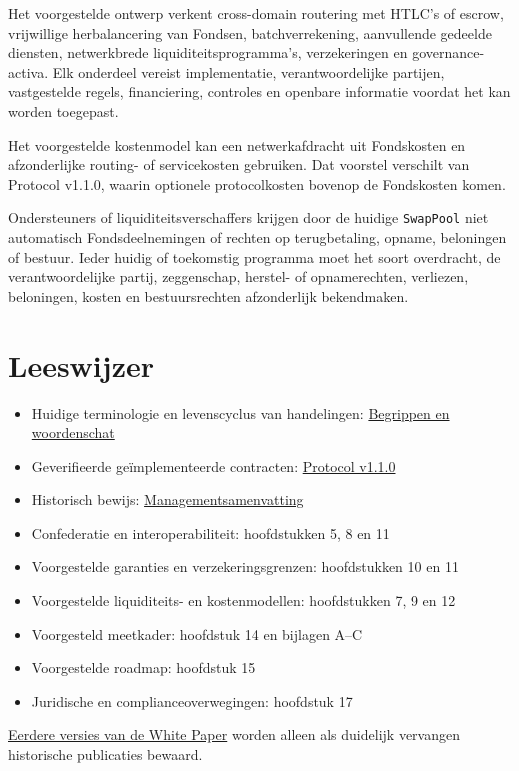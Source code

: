 \documentclass[11pt]{article}
\begin{document}
Het voorgestelde ontwerp verkent cross-domain routering met HTLC's of escrow, vrijwillige herbalancering van Fondsen, batchverrekening, aanvullende gedeelde diensten, netwerkbrede liquiditeitsprogramma's, verzekeringen en governance-activa. Elk onderdeel vereist implementatie, verantwoordelijke partijen, vastgestelde regels, financiering, controles en openbare informatie voordat het kan worden toegepast.

Het voorgestelde kostenmodel kan een netwerkafdracht uit Fondskosten en afzonderlijke routing- of servicekosten gebruiken. Dat voorstel verschilt van Protocol v1.1.0, waarin optionele protocolkosten bovenop de Fondskosten komen.

Ondersteuners of liquiditeitsverschaffers krijgen door de huidige \texttt{SwapPool} niet automatisch Fondsdeelnemingen of rechten op terugbetaling, opname, beloningen of bestuur. Ieder huidig of toekomstig programma moet het soort overdracht, de verantwoordelijke partij, zeggenschap, herstel- of opnamerechten, verliezen, beloningen, kosten en bestuursrechten afzonderlijk bekendmaken.

\section*{Leeswijzer}

\begin{itemize}[leftmargin=*]
\item Huidige terminologie en levenscyclus van handelingen: \href{https://docs.cosmolocal.credit/nl-BE/introduction/concepts}{Begrippen en woordenschat}
\item Geverifieerde geïmplementeerde contracten: \href{https://docs.cosmolocal.credit/nl-BE/protocol/overview}{Protocol v1.1.0}
\item Historisch bewijs: \href{https://docs.cosmolocal.credit/nl-BE/white-paper/executive-summary}{Managementsamenvatting}
\item Confederatie en interoperabiliteit: hoofdstukken 5, 8 en 11
\item Voorgestelde garanties en verzekeringsgrenzen: hoofdstukken 10 en 11
\item Voorgestelde liquiditeits- en kostenmodellen: hoofdstukken 7, 9 en 12
\item Voorgesteld meetkader: hoofdstuk 14 en bijlagen A--C
\item Voorgestelde roadmap: hoofdstuk 15
\item Juridische en complianceoverwegingen: hoofdstuk 17
\end{itemize}
\href{https://docs.cosmolocal.credit/nl-BE/white-paper/archive}{Eerdere versies van de White Paper} worden alleen als duidelijk vervangen historische publicaties bewaard.
\end{document}
